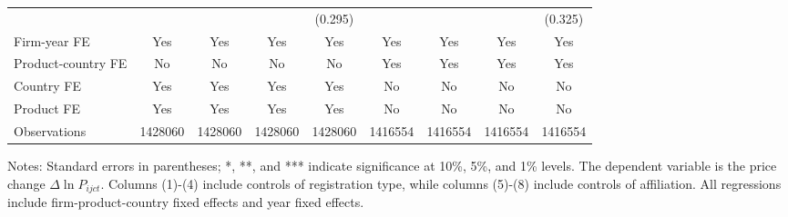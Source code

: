 \documentclass[12pt]{article}
\begin{document}
\begin{table}
\begin{threeparttable}
\begin{tabular}{lcccccccc}
			&       &       &       & (0.295) &&&& (0.325)\\
			Firm-year FE  &  Yes   & Yes   & Yes & Yes & Yes & Yes & Yes & Yes\\
			Product-country FE & No & No & No & No & Yes & Yes & Yes & Yes\\
			Country FE &  Yes   & Yes   & Yes   & Yes & No & No & No & No\\
			Product FE &  Yes   & Yes   & Yes   & Yes & No & No & No & No\\
			Observations & 1428060 & 1428060 & 1428060 & 1428060 & 1416554 & 1416554 & 1416554 & 1416554\\
			\bottomrule
		\end{tabular}
		\begin{tablenotes}
			\footnotesize
			\item[Notes:] Standard errors in parentheses; *, **, and *** indicate significance at 10\%, 5\%, and 1\% levels. The dependent variable is the price change $\Delta \ln P_{ijct}$. Columns (1)-(4) include controls of registration type, while columns (5)-(8) include controls of affiliation. All regressions include firm-product-country fixed effects and year fixed effects.
		\end{tablenotes}
	\end{threeparttable}
	\label{tab.robust.fe}
\end{table}
\end{document}
